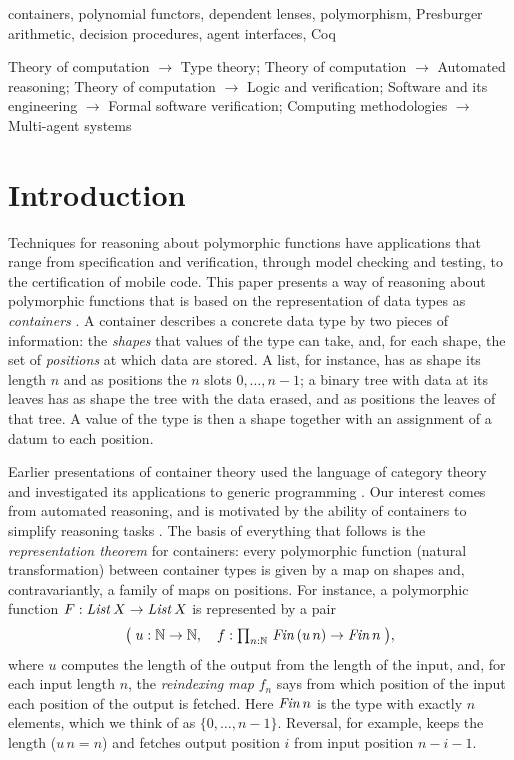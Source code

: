 \documentclass{fundam}
\begin{document}
\begin{keywords}
containers, polynomial functors, dependent lenses, polymorphism, Presburger arithmetic,
decision procedures, agent interfaces, Coq
\end{keywords}

\begin{acmclass}
Theory of computation $\to$ Type theory; Theory of computation $\to$ Automated
reasoning; Theory of computation $\to$ Logic and verification; Software and its
engineering $\to$ Formal software verification; Computing methodologies $\to$
Multi-agent systems
\end{acmclass}

\section{Introduction}\label{sec:intro}

Techniques for reasoning about polymorphic functions have applications that range from
specification and verification, through model checking and testing, to the certification
of mobile code.  This paper presents a way of reasoning about polymorphic functions that
is based on the representation of data types as \emph{containers}
\cite{Abbott03,AbbottAltenkirchGhani03,AbbottAltenkirchGhani05}.  A container describes a
concrete data type by two pieces of information: the \emph{shapes} that values of the
type can take, and, for each shape, the set of \emph{positions} at which data are stored.
A list, for instance, has as shape its length $n$ and as positions the $n$ slots
$0,\dots,n-1$; a binary tree with data at its leaves has as shape the tree with the data
erased, and as positions the leaves of that tree.  A value of the type is then a shape
together with an assignment of a datum to each position.

Earlier presentations of container theory used the language of category theory
\cite{AbbottAltenkirchGhani03,AbbottAltenkirchGhani05} and investigated its applications
to generic programming \cite{AltenkirchMcBrideMorris07,Morris07}.  Our interest comes from
automated reasoning, and is motivated by the ability of containers to simplify reasoning
tasks \cite{AbbottAltenkirchGhaniMcBride04,PrinceGhaniMcBride08}.  The basis of everything
that follows is the \emph{representation theorem} for containers: every polymorphic
function (natural transformation) between container types is given by a map on shapes
and, contravariantly, a family of maps on positions.  For instance, a polymorphic function
$F : \mathit{List}\,X \to \mathit{List}\,X$ is represented by a pair
\[
  \big(\;u : \mathbb{N} \to \mathbb{N},\quad f : \textstyle\prod_{n:\mathbb{N}}\, \mathit{Fin}\,(u\,n) \to \mathit{Fin}\,n\;\big),
\]
where $u$ computes the length of the output from the length of the input, and, for each
input length $n$, the \emph{reindexing map} $f_n$ says from which position of the input
each position of the output is fetched.  Here $\mathit{Fin}\,n$ is the type with exactly $n$
elements, which we think of as $\{0,\dots,n-1\}$.  Reversal, for example, keeps the length
($u\,n = n$) and fetches output position $i$ from input position $n - i - 1$.
\end{document}

